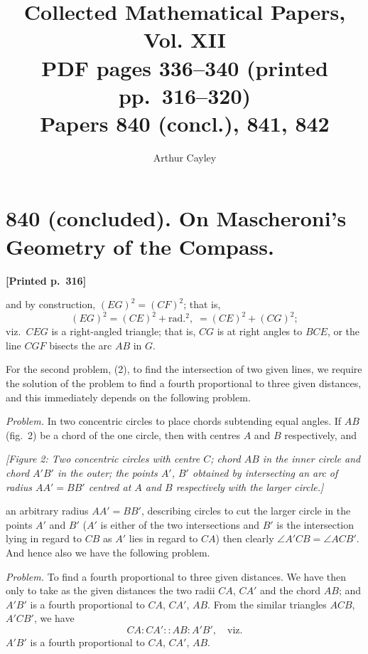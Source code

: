 \documentclass[11pt]{article}
\title{Collected Mathematical Papers, Vol. XII\\ \large PDF pages 336--340 (printed pp.\ 316--320)\\ Papers 840 (concl.), 841, 842}
\author{Arthur Cayley}
\date{}
\begin{document}
\maketitle


\section*{840 (concluded). On Mascheroni's Geometry of the Compass.}

\medskip

\noindent\textbf{[Printed p.~316]}\hfill

and by construction, $(EG)^{2} = (CF)^{2}$; that is,
\[
(EG)^{2} = (CE)^{2} + \mathrm{rad}.^{2}, \; = (CE)^{2} + (CG)^{2};
\]
viz.\ $CEG$ is a right-angled triangle; that is, $CG$ is at right angles to $BCE$, or the line $CGF$ bisects the arc $AB$ in $G$.

\medskip

For the second problem, (2), to find the intersection of two given lines, we require the solution of the problem to find a fourth proportional to three given distances, and this immediately depends on the following problem.

\medskip

\textit{Problem.} In two concentric circles to place chords subtending equal angles. If $AB$ (fig.~2) be a chord of the one circle, then with centres $A$ and $B$ respectively, and

\medskip

\textit{[Figure 2: Two concentric circles with centre $C$; chord $AB$ in the inner circle and chord $A'B'$ in the outer; the points $A'$, $B'$ obtained by intersecting an arc of radius $AA' = BB'$ centred at $A$ and $B$ respectively with the larger circle.]}

\medskip

an arbitrary radius $AA' = BB'$, describing circles to cut the larger circle in the points $A'$ and $B'$ ($A'$ is either of the two intersections and $B'$ is the intersection lying in regard to $CB$ as $A'$ lies in regard to $CA$) then clearly $\angle A'CB = \angle ACB'$. And hence also we have the following problem.

\medskip

\textit{Problem.} To find a fourth proportional to three given distances. We have then only to take as the given distances the two radii $CA$, $CA'$ and the chord $AB$; and $A'B'$ is a fourth proportional to $CA$, $CA'$, $AB$. From the similar triangles $ACB$, $A'CB'$, we have
\[
CA : CA' :: AB : A'B', \quad \text{viz.}
\]
$A'B'$ is a fourth proportional to $CA$, $CA'$, $AB$.
\end{document}
